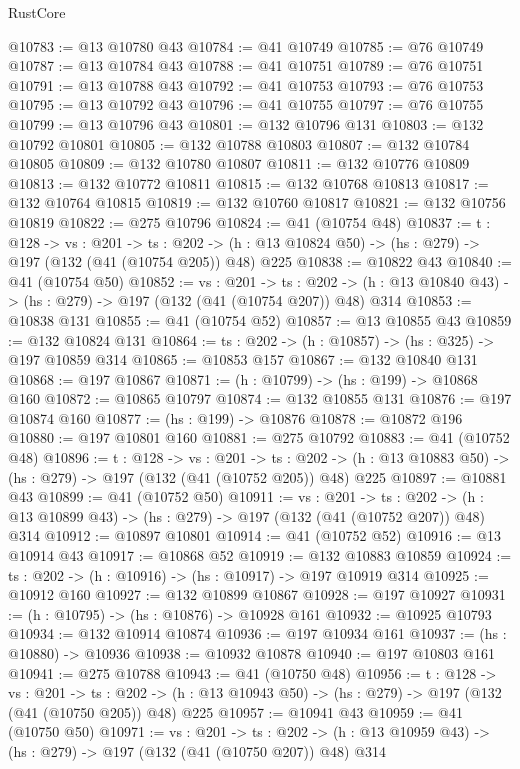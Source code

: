 \begin{lexlean}{RustCore}
\begin{coremodule}
@10783 := @13 @10780 @43
@10784 := @41 @10749
@10785 := @76 @10749
@10787 := @13 @10784 @43
@10788 := @41 @10751
@10789 := @76 @10751
@10791 := @13 @10788 @43
@10792 := @41 @10753
@10793 := @76 @10753
@10795 := @13 @10792 @43
@10796 := @41 @10755
@10797 := @76 @10755
@10799 := @13 @10796 @43
@10801 := @132 @10796 @131
@10803 := @132 @10792 @10801
@10805 := @132 @10788 @10803
@10807 := @132 @10784 @10805
@10809 := @132 @10780 @10807
@10811 := @132 @10776 @10809
@10813 := @132 @10772 @10811
@10815 := @132 @10768 @10813
@10817 := @132 @10764 @10815
@10819 := @132 @10760 @10817
@10821 := @132 @10756 @10819
@10822 := @275 @10796
@10824 := @41 (@10754 @48)
@10837 := {t : @128} ->
  {vs : @201} ->
  {ts : @202} -> (h : @13 @10824 @50) -> (hs : @279) -> @197 (@132 (@41 (@10754 @205)) @48) @225
@10838 := @10822 @43
@10840 := @41 (@10754 @50)
@10852 := {vs : @201} ->
  {ts : @202} -> (h : @13 @10840 @43) -> (hs : @279) -> @197 (@132 (@41 (@10754 @207)) @48) @314
@10853 := @10838 @131
@10855 := @41 (@10754 @52)
@10857 := @13 @10855 @43
@10859 := @132 @10824 @131
@10864 := {ts : @202} -> (h : @10857) -> (hs : @325) -> @197 @10859 @314
@10865 := @10853 @157
@10867 := @132 @10840 @131
@10868 := @197 @10867
@10871 := (h : @10799) -> (hs : @199) -> @10868 @160
@10872 := @10865 @10797
@10874 := @132 @10855 @131
@10876 := @197 @10874 @160
@10877 := (hs : @199) -> @10876
@10878 := @10872 @196
@10880 := @197 @10801 @160
@10881 := @275 @10792
@10883 := @41 (@10752 @48)
@10896 := {t : @128} ->
  {vs : @201} ->
  {ts : @202} -> (h : @13 @10883 @50) -> (hs : @279) -> @197 (@132 (@41 (@10752 @205)) @48) @225
@10897 := @10881 @43
@10899 := @41 (@10752 @50)
@10911 := {vs : @201} ->
  {ts : @202} -> (h : @13 @10899 @43) -> (hs : @279) -> @197 (@132 (@41 (@10752 @207)) @48) @314
@10912 := @10897 @10801
@10914 := @41 (@10752 @52)
@10916 := @13 @10914 @43
@10917 := @10868 @52
@10919 := @132 @10883 @10859
@10924 := {ts : @202} -> (h : @10916) -> (hs : @10917) -> @197 @10919 @314
@10925 := @10912 @160
@10927 := @132 @10899 @10867
@10928 := @197 @10927
@10931 := (h : @10795) -> (hs : @10876) -> @10928 @161
@10932 := @10925 @10793
@10934 := @132 @10914 @10874
@10936 := @197 @10934 @161
@10937 := (hs : @10880) -> @10936
@10938 := @10932 @10878
@10940 := @197 @10803 @161
@10941 := @275 @10788
@10943 := @41 (@10750 @48)
@10956 := {t : @128} ->
  {vs : @201} ->
  {ts : @202} -> (h : @13 @10943 @50) -> (hs : @279) -> @197 (@132 (@41 (@10750 @205)) @48) @225
@10957 := @10941 @43
@10959 := @41 (@10750 @50)
@10971 := {vs : @201} ->
  {ts : @202} -> (h : @13 @10959 @43) -> (hs : @279) -> @197 (@132 (@41 (@10750 @207)) @48) @314

\end{coremodule}
\end{lexlean}
